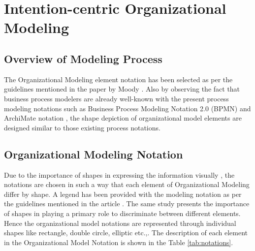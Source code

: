 \chapter{Intention-centric Organizational Modeling}
\label{chap:orgModeling}

\section{Overview of Modeling Process}
\hspace{4ex} The Organizational Modeling element notation has been selected as per the guidelines mentioned in the paper by Moody \cite{Moody2009}. Also by observing  the fact that business process modelers are already well-known with the present process modeling notations such as Business Process Modeling Notation 2.0 (BPMN) \cite{bpm2011} and ArchiMate notation \cite{arc2013}, the shape depiction of organizational model elements are designed similar to those existing process notations. 





\section{Organizational Modeling Notation}
\hspace{4ex} Due to the importance of shapes in expressing the information visually , the notations are chosen in such a way that each element of Organizational Modeling  differ by shape. A legend has been provided with the modeling notation as per the guidelines mentioned in the article \cite{Moody2009}. The same study \cite{Moody2009} presents the importance of shapes in playing a primary role to discriminate between different elements. Hence the organizational model notations are represented through individual shapes like rectangle, double circle, elliptic etc.,. The description of each element in the Organizational Model Notation is shown in the Table \ref{tab:notations}. 

